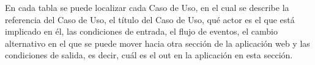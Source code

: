 \documentclass{article}
\begin{document}

En cada tabla se puede localizar cada Caso de Uso, en el cual se describe la referencia del Caso de Uso, el título del Caso de Uso, qué actor es el que está implicado en él, las condiciones de entrada, el flujo de eventos, el cambio alternativo en el que se puede mover hacia otra sección de la aplicación web y las condiciones de salida, es decir, cuál es el out en la aplicación en esta sección.
\end{document}
